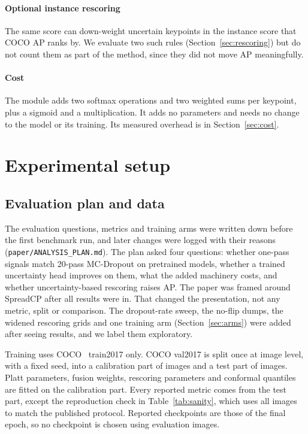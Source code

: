 \documentclass[preprint,11pt]{elsarticle}
\newcommand{\method}{SpreadCP}
\begin{document}
\paragraph{Optional instance rescoring} The same score can down-weight uncertain keypoints in the
instance score that COCO AP ranks by. We evaluate two such rules (Section~\ref{sec:rescoring}) but do
not count them as part of the method, since they did not move AP meaningfully.

\paragraph{Cost} The module adds two softmax operations and two weighted sums per keypoint, plus a
sigmoid and a multiplication. It adds no parameters and needs no change to the model or its training.
Its measured overhead is in Section~\ref{sec:cost}.

\section{Experimental setup}

\subsection{Evaluation plan and data}\label{sec:plan}

The evaluation questions, metrics and training arms were written down before the first benchmark
run, and later changes were logged with their reasons (\texttt{paper/ANALYSIS\_PLAN.md}). The plan
asked four questions: whether one-pass signals match 20-pass MC-Dropout on pretrained models, whether
a trained uncertainty head improves on them, what the added machinery costs, and whether
uncertainty-based rescoring raises AP. The paper was framed around \method{} after all results were
in. That changed the presentation, not any metric, split or comparison. The dropout-rate
sweep, the no-flip dumps, the widened rescoring grids and one training arm
(Section~\ref{sec:arms}) were added after seeing results, and we label them exploratory.

Training uses COCO~\cite{lin2014coco} train2017 only. COCO val2017 is split once at image level,
with a fixed seed, into a calibration part of \numCalImages{} images and a test part of
\numTestImages{} images. Platt parameters, fusion weights, rescoring parameters and conformal
quantiles are fitted on the calibration part. Every reported metric comes from the test part,
except the reproduction check in Table~\ref{tab:sanity}, which uses all images to match the
published protocol. Reported checkpoints are those of the final epoch, so no checkpoint is chosen
using evaluation images.
\end{document}
